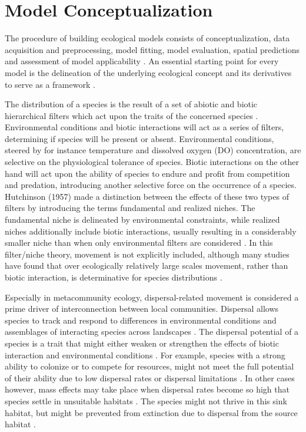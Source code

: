 \documentclass[12pt,authoryear]{elsarticle}
\begin{document}
\section{Model Conceptualization}
\label{Model:Conceptualization}

The procedure of building ecological models consists of conceptualization, data acquisition and preprocessing, model fitting, model evaluation, spatial predictions and assessment of model applicability \citep{Guisan2000}. An essential starting point for every model is the delineation of the underlying ecological concept and its derivatives to serve as a framework \citep{Guisan2000}.

The distribution of a species is the result of a set of abiotic and biotic hierarchical filters which act upon the traits of the concerned species \citep{Austin2002}. Environmental conditions and biotic interactions will act as a series of filters, determining if species will be present or absent. Environmental conditions, steered by for instance temperature and dissolved oxygen (DO) concentration, are selective on the physiological tolerance of species. Biotic interactions on the other hand will act upon the ability of species to endure and profit from competition and predation, introducing another selective force on the occurrence of a species. Hutchinson (1957) made a distinction between the effects of these two types of filters by introducing the terms fundamental and realized niches\nocite{Hutchinson1957}. The fundamental niche is delineated by environmental constraints, while realized niches additionally include biotic interactions, usually resulting in a considerably smaller niche than when only environmental filters are considered \citep{Guisan2000}. In this filter/niche theory, movement is not explicitly included, although many studies have found that over ecologically relatively large scales movement, rather than biotic interaction, is determinative for species distributions \citep{Guisan2005,Soberon2005,Peters2005,Peterson2006}. 

Especially in metacommunity ecology, dispersal-related movement is considered a prime driver of interconnection between local communities. Dispersal allows species to track and respond to differences in environmental conditions and assemblages of interacting species across landscapes \citep{Leibold2004}. The dispersal potential of a species is a trait that might either weaken or strengthen the effects of biotic interaction and environmental conditions \citep{Leibold2017}. For example, species with a strong ability to colonize or to compete for resources, might not meet the full potential of their ability due to low dispersal rates or dispersal limitations \citep{Heino2015}. In other cases however, mass effects may take place when dispersal rates become so high that species settle in unsuitable habitats \citep{Heino2015}. The species might not thrive in this sink habitat, but might be prevented from extinction due to dispersal from the source habitat \citep{Heino2015}.
\end{document}
